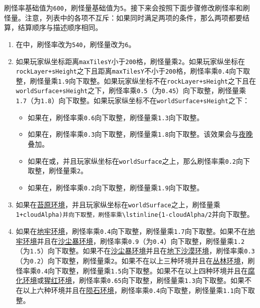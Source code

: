 刷怪率基础值为\lstinline{600}，刷怪量基础值为\lstinline{5}。接下来会按照下面步骤修改刷怪率和刷怪量。注意，列表中的各项不互斥：如果同时满足两项的条件，那么两项都要结算，结算顺序与描述顺序相同。
\begin{enumerate}
    \item 在中，刷怪率改为\lstinline{540}，刷怪量改为\lstinline{6}。
    \item 如果玩家纵坐标距离\lstinline{maxTilesY}小于\lstinline{200}格，刷怪量乘\lstinline{2}。如果玩家纵坐标在\lstinline{rockLayer+sHeight}之下且距离\lstinline{maxTilesY}不小于\lstinline{200}格，刷怪率乘\lstinline{0.4}向下取整，刷怪量乘\lstinline{1.9}向下取整。如果玩家纵坐标不在\lstinline{rockLayer+sHeight}之下且在\lstinline{worldSurface+sHeight}之下，刷怪率乘\lstinline{0.5}（为\lstinline{0.45}）向下取整，刷怪量乘\lstinline{1.7}（为\lstinline{1.8}）向下取整。如果玩家纵坐标不在\lstinline{worldSurface+sHeight}之下：\begin{itemize}
        \item 如果在，刷怪率乘\lstinline{0.6}向下取整，刷怪量乘\lstinline{1.3}向下取整。\label{app36}
        \item 如果在，刷怪率乘\lstinline{0.3}向下取整，刷怪量乘\lstinline{1.8}向下取整。该效果会与\hyperref[app36]{夜晚}叠加。
        \item 如果在或，并且玩家纵坐标在\lstinline{worldSurface}之上，那么刷怪率乘\lstinline{0.2}向下取整，刷怪量乘\lstinline{2}。
        \item 如果在，刷怪率乘\lstinline{0.2}向下取整，刷怪量乘\lstinline{1.9}向下取整。
    \end{itemize}
    \item 如果在\hyperref[app37]{苔原环境}，并且玩家纵坐标在\lstinline{worldSurface}之上，刷怪量乘\lstinline{1+cloudAlpha)并向下取整，刷怪率乘\lstinline{1-cloudAlpha/2}并向下取整。
    \item 如果在\hyperref[app37]{地牢环境}，刷怪率乘\lstinline{0.4}向下取整，刷怪量乘\lstinline{1.7}向下取整。如果不在\hyperref[app37]{地牢环境}并且在\hyperref[app37]{沙尘暴环境}，刷怪率乘\lstinline{0.9}（为\lstinline{0.4}）向下取整，刷怪量乘\lstinline{1.2}（为\lstinline{1.5}）向下取整。如果不在\hyperref[app37]{沙尘暴环境}并且在\hyperref[app37]{地下沙漠环境}，刷怪率乘\lstinline{0.3}（为\lstinline{0.2}）向下取整，刷怪量乘\lstinline{2}。如果不在以上三种环境并且在\hyperref[app37]{丛林环境}，刷怪率乘\lstinline{0.4}向下取整，刷怪量乘\lstinline{1.5}向下取整。如果不在以上四种环境并且在\hyperref[app37]{腐化环境}或\hyperref[app37]{猩红环境}，刷怪率乘\lstinline{0.65}向下取整，刷怪量乘\lstinline{1.3}向下取整。如果不在以上六种环境并且在\hyperref[app37]{陨石环境}，刷怪率乘\lstinline{0.4}向下取整，刷怪量乘\lstinline{1.1}向下取整。

\end{enumerate}
